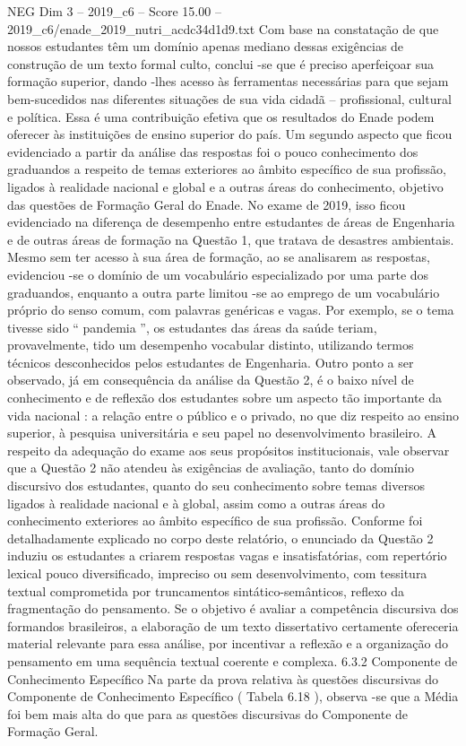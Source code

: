 \begin{textsample}{NEG Dim 3 – 2019\_c6 – Score 15.00 – 2019\_c6/enade\_2019\_nutri\_acdc34d1d9.txt}
Com base na constatação de que nossos estudantes têm um domínio apenas mediano dessas exigências de construção de um texto formal culto, conclui -se que é preciso aperfeiçoar sua formação superior, dando -lhes acesso às ferramentas necessárias para que sejam bem-sucedidos nas diferentes situações de sua vida cidadã – profissional, cultural e política.
Essa é uma contribuição efetiva que os resultados do Enade podem oferecer às instituições de ensino superior do país.
Um segundo aspecto que ficou evidenciado a partir da análise das respostas foi o pouco conhecimento dos graduandos a respeito de temas exteriores ao âmbito específico de sua profissão, ligados à realidade nacional e global e a outras áreas do conhecimento, objetivo das questões de Formação Geral do Enade.
No exame de 2019, isso ficou evidenciado na diferença de desempenho entre estudantes de áreas de Engenharia e de outras áreas de formação na Questão 1, que tratava de desastres ambientais.
Mesmo sem ter acesso à sua área de formação, ao se analisarem as respostas, evidenciou -se o domínio de um vocabulário especializado por uma parte dos graduandos, enquanto a outra parte limitou -se ao emprego de um vocabulário próprio do senso comum, com palavras genéricas e vagas.
Por exemplo, se o tema tivesse sido “ pandemia ”, os estudantes das áreas da saúde teriam, provavelmente, tido um desempenho vocabular distinto, utilizando termos técnicos desconhecidos pelos estudantes de Engenharia.
Outro ponto a ser observado, já em consequência da análise da Questão 2, é o baixo nível de conhecimento e de reflexão dos estudantes sobre um aspecto tão importante da vida nacional : a relação entre o público e o privado, no que diz respeito ao ensino superior, à pesquisa universitária e seu papel no desenvolvimento brasileiro.
A respeito da adequação do exame aos seus propósitos institucionais, vale observar que a Questão 2 não atendeu às exigências de avaliação, tanto do domínio discursivo dos estudantes, quanto do seu conhecimento sobre temas diversos ligados à realidade nacional e à global, assim como a outras áreas do conhecimento exteriores ao âmbito específico de sua profissão.
Conforme foi detalhadamente explicado no corpo deste relatório, o enunciado da Questão 2 induziu os estudantes a criarem respostas vagas e insatisfatórias, com repertório lexical pouco diversificado, impreciso ou sem desenvolvimento, com tessitura textual comprometida por truncamentos sintático-semânticos, reflexo da fragmentação do pensamento.
Se o objetivo é avaliar a competência discursiva dos formandos brasileiros, a elaboração de um texto dissertativo certamente ofereceria material relevante para essa análise, por incentivar a reflexão e a organização do pensamento em uma sequência textual coerente e complexa. 6.3.2 Componente de Conhecimento Específico Na parte da prova relativa às questões discursivas do Componente de Conhecimento Específico ( Tabela 6.18 ), observa -se que a Média foi bem mais alta do que para as questões discursivas do Componente de Formação Geral.

\end{textsample}
